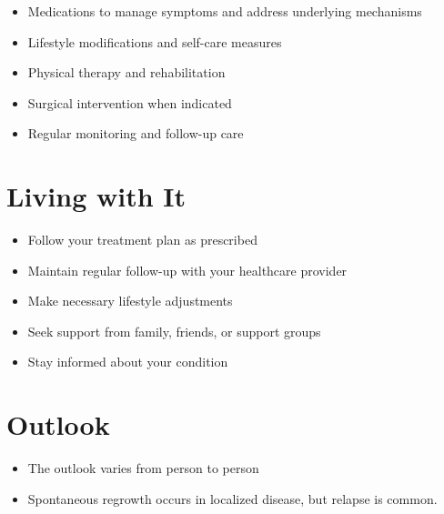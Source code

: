 \begin{itemize}[noitemsep]
  \item Medications to manage symptoms and address underlying mechanisms
  \item Lifestyle modifications and self-care measures
  \item Physical therapy and rehabilitation
  \item Surgical intervention when indicated
  \item Regular monitoring and follow-up care
\end{itemize}
\section{Living with It}
\begin{itemize}[noitemsep]
  \item Follow your treatment plan as prescribed
  \item Maintain regular follow-up with your healthcare provider
  \item Make necessary lifestyle adjustments
  \item Seek support from family, friends, or support groups
  \item Stay informed about your condition
\end{itemize}
\section{Outlook}
\begin{itemize}[noitemsep]
  \item The outlook varies from person to person
  \item Spontaneous regrowth occurs in localized disease, but relapse is common.
\end{itemize}

